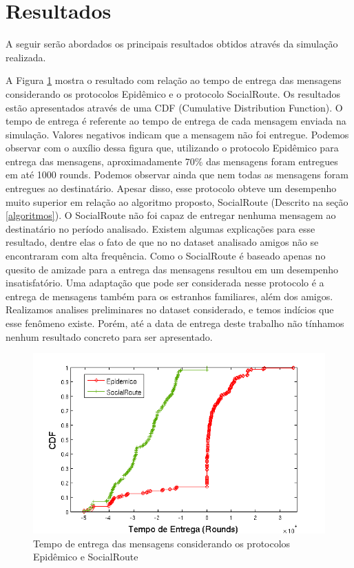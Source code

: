 \section{Resultados}\label{sec:figs}

A seguir serão abordados os principais resultados obtidos através da
simulação realizada.

A Figura \ref{fig:Epidemico_SocialRoute} mostra o resultado com relação
ao tempo de entrega das mensagens considerando os protocolos Epidêmico e
o protocolo SocialRoute. Os resultados estão apresentados através de uma
CDF (Cumulative Distribution Function). O tempo de entrega é referente
ao tempo de entrega de cada mensagem enviada na simulação. Valores
negativos indicam que a mensagem não foi entregue. Podemos observar com
o auxílio dessa figura que, utilizando o protocolo Epidêmico para
entrega das mensagens, aproximadamente 70\% das mensagens foram
entregues em até 1000 rounds. Podemos observar ainda que nem todas as
mensagens foram entregues ao destinatário. Apesar disso, esse protocolo
obteve um desempenho muito superior em relação ao algoritmo proposto,
SocialRoute (Descrito na seção \ref{algoritmos}). O SocialRoute não foi
capaz de entregar nenhuma mensagem ao destinatário no período
analisado. Existem algumas explicações para esse resultado, dentre elas
o fato de que no no dataset analisado amigos não se encontraram com alta
frequência. Como o SocialRoute é baseado apenas no quesito de amizade
para a entrega das mensagens resultou em um desempenho insatisfatório.
Uma adaptação que pode ser considerada nesse protocolo é a entrega de
mensagens também para os estranhos familiares, além dos amigos.
Realizamos analises preliminares no dataset considerado, e temos
indícios que esse fenômeno existe. Porém, até a data de entrega deste
trabalho não tínhamos nenhum resultado concreto para ser apresentado.

\begin{figure}[ht]
\centering
\includegraphics[width=.7\textwidth]{img/tempo_epidemico_socialRoute.png}
\caption{Tempo de entrega das mensagens considerando os protocolos
Epidêmico e SocialRoute}
\label{fig:Epidemico_SocialRoute}
\end{figure}

